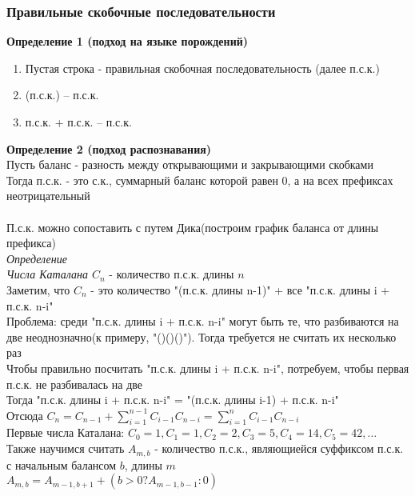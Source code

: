 \documentclass[12pt]{article}
\begin{document}
\subsubsection{Правильные скобочные последовательности}
\textbf{Определение 1 (подход на языке порождений)}
\begin{enumerate}
    \item Пустая строка - правильная скобочная последовательность (далее п.с.к.)
    \item (п.с.к.) -- п.с.к.
    \item п.с.к. + п.с.к. -- п.с.к.
\end{enumerate}
\textbf{Определение 2 (подход распознавания)}\\
Пусть баланс - разность между открывающими и закрывающими скобками\\
Тогда п.с.к. - это с.к., суммарный баланс которой равен 0, а на всех префиксах неотрицательный\\\\
П.с.к. можно сопоставить с путем Дика(построим график баланса от длины префикса)\\
\textit{Определение}\\
\textit{Числа Каталана $C_n$} - количество п.с.к. длины $n$\\
Заметим, что $C_n$ - это количество "(п.с.к. длины n-1)" + все "п.с.к. длины i + п.с.к. n-i"\\
Проблема: среди "п.с.к. длины i + п.с.к. n-i" могут быть те, что разбиваются на две неоднозначно(к примеру, "()()()"). Тогда требуется не считать их несколько раз\\
Чтобы правильно посчитать "п.с.к. длины i + п.с.к. n-i", потребуем, чтобы первая п.с.к. не разбивалась на две\\
Тогда "п.с.к. длины i + п.с.к. n-i" = "(п.с.к. длины i-1) + п.с.к. n-i"\\
Отсюда $C_n = C_{n-1} + \sum_{i=1}^{n-1}C_{i-1}C_{n-i} = \sum_{i=1}^{n}C_{i-1}C_{n-i}$\\
Первые числа Каталана: $C_0 = 1, C_1 = 1, C_2 = 2, C_3 = 5, C_4 = 14, C_5 = 42, \ldots$\\
Также научимся считать $A_{m,b}$ - количество п.с.к., являющиейся суффиксом п.с.к. с начальным балансом $b$, длины $m$\\
$A_{m,b} = A_{m-1, b+1}+(b > 0 ? A_{m-1,b-1} : 0)$
\end{document}
